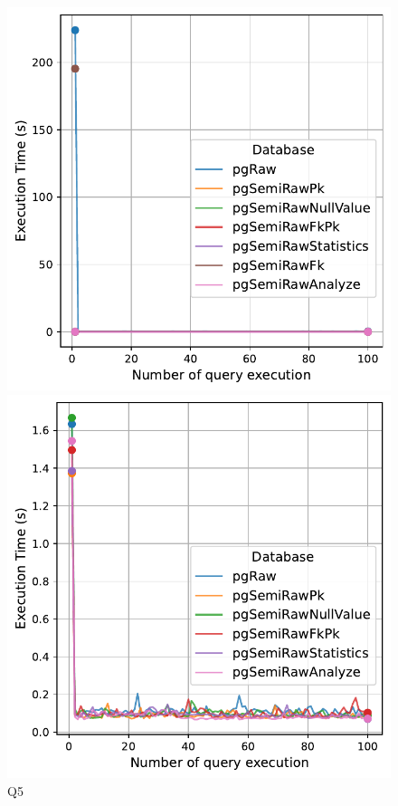 \begin{figure}[h!]
\centering
\begin{minipage}[b]{0.45\linewidth}
    \centering
    \includegraphics[width=1.0\linewidth]{charts-eval-exp-time/execution_time_db_type_Q5.pdf}
    \caption*{Q5}
\end{minipage}
\hfill
\begin{minipage}[b]{0.45\linewidth}
    \centering
    \includegraphics[width=1.0\linewidth]{charts-eval-exp-time/execution_time_db_type_Q6.pdf}

\end{minipage}
\end{figure}

